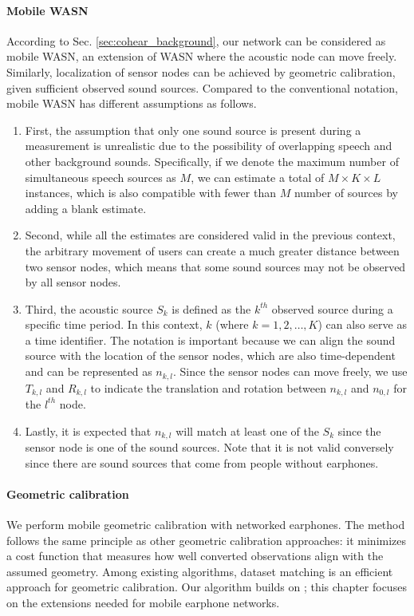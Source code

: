 \paragraph{Mobile WASN}
According to Sec. \ref{sec:cohear_background}, our network can be considered as mobile WASN, an extension of WASN where the acoustic node can move freely. Similarly, localization of sensor nodes can be achieved by geometric calibration, given sufficient observed sound sources. Compared to the conventional notation, mobile WASN has different assumptions as follows.

\begin{enumerate}
    \item First, the assumption that only one sound source is present during a measurement is unrealistic due to the possibility of overlapping speech and other background sounds. Specifically, if we denote the maximum number of simultaneous speech sources as \(M\), we can estimate a total of \(M \times K \times L\) instances, which is also compatible with fewer than \(M\) number of sources by adding a blank estimate.
    \item Second, while all the estimates are considered valid in the previous context, the arbitrary movement of users can create a much greater distance between two sensor nodes, which means that some sound sources may not be observed by all sensor nodes.
    \item Third, the acoustic source \(S_{k}\) is defined as the \(k^{th}\) observed source during a specific time period. In this context, \(k\) (where \(k = 1, 2, \ldots, K\)) can also serve as a time identifier. The notation is important because we can align the sound source with the location of the sensor nodes, which are also time-dependent and can be represented as \(n_{k,l}\). Since the sensor nodes can move freely, we use \(T_{k,l}\) and \(R_{k,l}\) to indicate the translation and rotation between \(n_{k,l}\) and \(n_{0,l}\) for the \(l^{th}\) node.
    \item Lastly, it is expected that \(n_{k,l}\) will match at least one of the \(S_{k}\) since the sensor node is one of the sound sources. Note that it is not valid conversely since there are sound sources that come from people without earphones. 
\end{enumerate}


\paragraph{Geometric calibration}
We perform mobile geometric calibration with networked earphones. The method follows the same principle as other geometric calibration approaches: it minimizes a cost function that measures how well converted observations align with the assumed geometry. Among existing algorithms, dataset matching is an efficient approach for geometric calibration. Our algorithm builds on \cite{gburrek2021geometry}; this chapter focuses on the extensions needed for mobile earphone networks.


